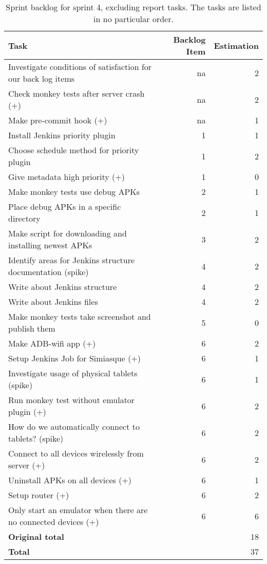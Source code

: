 \begin{table}%
  \centering
  \begin{tabular}{p{}rr}
    \toprule
    \textbf{Task} & \textbf{Backlog Item} & \textbf{Estimation} \\
    \midrule
    Investigate conditions of satisfaction for our back log items & na & 2 \\
    Check monkey tests after server crash (+) & na & 2 \\
    Make pre-commit hook (+) & na & 1 \\
    Install Jenkins priority plugin & 1 & 1 \\
    Choose schedule method for priority plugin & 1 & 2 \\
    Give metadata high priority (+) & 1 & 0 \\
    Make monkey tests use debug APKs & 2 & 1 \\
    Place debug APKs in a specific directory & 2 & 1 \\
    Make script for downloading and installing newest APKs & 3 & 2 \\
    Identify areas for Jenkins structure documentation (spike) & 4 & 2 \\
    Write about Jenkins structure & 4 & 2 \\
    Write about Jenkins files & 4 & 2 \\
    Make monkey tests take screenshot and publish them & 5 & 0 \\
    Make ADB-wifi app (+) & 6 & 2 \\
    Setup Jenkins Job for Simiasque (+) & 6 & 1 \\
    Investigate usage of physical tablets (spike) & 6 & 1 \\
    Run monkey test without emulator plugin (+) & 6 & 2 \\
    How do we automatically connect to tablets? (spike) & 6 & 2 \\
    Connect to all devices wirelessly from server (+) & 6 & 2 \\
    Uninstall APKs on all devices (+) & 6 & 1 \\
    Setup router (+) & 6 & 2 \\
    Only start an emulator when there are no connected devices (+) & 6 & 6 \\
    \midrule
    \textbf{Original total} & & 18 \\
    \textbf{Total} & & 37 \\
    \bottomrule
  \end{tabular}
\caption[Sprint 4 backlog]{Sprint backlog for sprint 4, excluding report tasks. The tasks are listed in no particular order.}
\label{tab:sprint4_tasks}
\end{table}